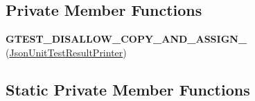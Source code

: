 \subsection*{Private Member Functions}
\begin{DoxyCompactItemize}
\item 
\mbox{\label{classtesting_1_1internal_1_1_json_unit_test_result_printer_a523698d681147f4315e3a66bc8ab1a72}} 
{\bfseries G\+T\+E\+S\+T\+\_\+\+D\+I\+S\+A\+L\+L\+O\+W\+\_\+\+C\+O\+P\+Y\+\_\+\+A\+N\+D\+\_\+\+A\+S\+S\+I\+G\+N\+\_\+} (\mbox{\hyperlink{classtesting_1_1internal_1_1_json_unit_test_result_printer}{Json\+Unit\+Test\+Result\+Printer}})
\end{DoxyCompactItemize}
\subsection*{Static Private Member Functions}
